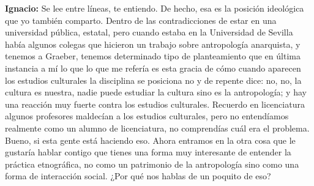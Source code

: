 \documentclass[
]{interact}
\begin{document}
\textbf{Ignacio:} Se lee entre líneas, te entiendo. De hecho, esa es la
posición ideológica que yo también comparto. Dentro de las
contradicciones de estar en una universidad pública, estatal, pero
cuando estaba en la Universidad de Sevilla había algunos colegas que
hicieron un trabajo sobre antropología anarquista, y tenemos a Graeber,
tenemos determinado tipo de planteamiento que en última instancia a mí
lo que lo que me refería es esta gracia de cómo cuando aparecen los
estudios culturales la disciplina se posiciona no y de repente dice: no,
no, la cultura es nuestra, nadie puede estudiar la cultura sino es la
antropología; y hay una reacción muy fuerte contra los estudios
culturales. Recuerdo en licenciatura algunos profesores maldecían a los
estudios culturales, pero no entendíamos realmente como un alumno de
licenciatura, no comprendías cuál era el problema. Bueno, si esta gente
está haciendo eso. Ahora entramos en la otra cosa que le gustaría hablar
contigo que tienes una forma muy interesante de entender la práctica
etnográfica, no como un patrimonio de la antropología sino como una
forma de interacción social. ¿Por qué nos hablas de un poquito de eso?
\end{document}
